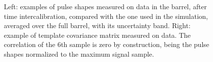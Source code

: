 \documentclass[journal]{IEEEtran}
\begin{document}
\begin{figure}[!t]
  \centerline
    \hfil
    \caption{Left: examples of pulse shapes measured on data in the barrel, after time intercalibration, compared with the one used in the simulation, averaged over the full barrel, with its uncertainty band. Right: example of template covariance matrix measured on data. The correlation of the 6th sample is zero by construction, being the pulse shapes normalized to the maximum signal sample. \label{fig:pulse_shapes} }
\end{figure}
%
\end{document}
